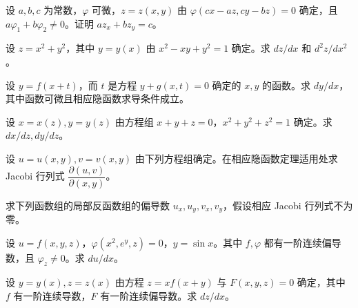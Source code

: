 \newpage
\noindent\begin{minipage}{\textwidth}
设 $a,b,c$ 为常数，$\varphi$ 可微，$z=z(x,y)$ 由 $\varphi(cx-az,cy-bz)=0$ 确定，且 $a\varphi_1+b\varphi_2\ne0$。证明 $az_x+bz_y=c$。
\end{minipage}\par\vfill
\noindent\begin{minipage}{\textwidth}
设 $z=x^2+y^2$，其中 $y=y(x)$ 由 $x^2-xy+y^2=1$ 确定。求 $dz/dx$ 和 $d^2z/dx^2$。
\end{minipage}\par\vfill
\noindent\begin{minipage}{\textwidth}
设 $y=f(x+t)$，而 $t$ 是方程 $y+g(x,t)=0$ 确定的 $x,y$ 的函数。求 $dy/dx$，其中函数可微且相应隐函数求导条件成立。
\end{minipage}\par\vfill
\noindent\begin{minipage}{\textwidth}
设 $x=x(z),y=y(z)$ 由方程组 $x+y+z=0$，$x^2+y^2+z^2=1$ 确定。求 $dx/dz,dy/dz$。
\end{minipage}\par\vfill
\newpage
\noindent\begin{minipage}{\textwidth}
设 $u=u(x,y),v=v(x,y)$ 由下列方程组确定。在相应隐函数定理适用处求 Jacobi 行列式 $\dfrac{\partial(u,v)}{\partial(x,y)}$。
\end{minipage}\par\vfill
\noindent\begin{minipage}{\textwidth}
求下列函数组的局部反函数组的偏导数 $u_x,u_y,v_x,v_y$，假设相应 Jacobi 行列式不为零。
\end{minipage}\par\vfill
\noindent\begin{minipage}{\textwidth}
设 $u=f(x,y,z)$，$\varphi(x^2,e^y,z)=0$，$y=\sin x$。其中 $f,\varphi$ 都有一阶连续偏导数，且 $\varphi_z\ne0$。求 $du/dx$。
\end{minipage}\par\vfill
\noindent\begin{minipage}{\textwidth}
设 $y=y(x),z=z(x)$ 由方程 $z=xf(x+y)$ 与 $F(x,y,z)=0$ 确定，其中 $f$ 有一阶连续导数，$F$ 有一阶连续偏导数。求 $dz/dx$。
\end{minipage}\par\vfill
